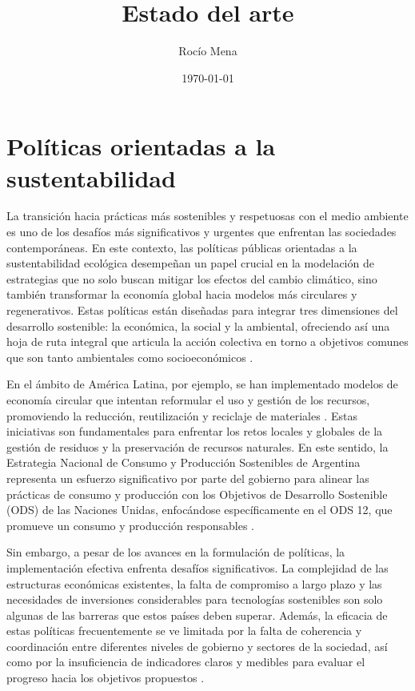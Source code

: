 \documentclass[main.tex]{subfiles}
\title{Estado del arte}
\author{Rocío Mena}
\date{\today}
\begin{document}
\maketitle

\section{Políticas orientadas a la sustentabilidad}

La transición hacia prácticas más sostenibles y respetuosas con el medio ambiente es uno de los desafíos más significativos y urgentes que enfrentan las sociedades contemporáneas. En este contexto, las políticas públicas orientadas a la sustentabilidad ecológica desempeñan un papel crucial en la modelación de estrategias que no solo buscan mitigar los efectos del cambio climático, sino también transformar la economía global hacia modelos más circulares y regenerativos. Estas políticas están diseñadas para integrar tres dimensiones del desarrollo sostenible: la económica, la social y la ambiental, ofreciendo así una hoja de ruta integral que articula la acción colectiva en torno a objetivos comunes que son tanto ambientales como socioeconómicos \cite{gil2018objetivos}.

En el ámbito de América Latina, por ejemplo, se han implementado modelos de economía circular que intentan reformular el uso y gestión de los recursos, promoviendo la reducción, reutilización y reciclaje de materiales \cite{rodriguez2023modelamiento, cepal2021economia}. Estas iniciativas son fundamentales para enfrentar los retos locales y globales de la gestión de residuos y la preservación de recursos naturales. En este sentido, la Estrategia Nacional de Consumo y Producción Sostenibles de Argentina representa un esfuerzo significativo por parte del gobierno para alinear las prácticas de consumo y producción con los Objetivos de Desarrollo Sostenible (ODS) de las Naciones Unidas, enfocándose específicamente en el ODS 12, que promueve un consumo y producción responsables \cite{sostenible2021argentina}.

Sin embargo, a pesar de los avances en la formulación de políticas, la implementación efectiva enfrenta desafíos significativos. La complejidad de las estructuras económicas existentes, la falta de compromiso a largo plazo y las necesidades de inversiones considerables para tecnologías sostenibles son solo algunas de las barreras que estos países deben superar. Además, la eficacia de estas políticas frecuentemente se ve limitada por la falta de coherencia y coordinación entre diferentes niveles de gobierno y sectores de la sociedad, así como por la insuficiencia de indicadores claros y medibles para evaluar el progreso hacia los objetivos propuestos \cite{gil2018objetivos}.
\end{document}
